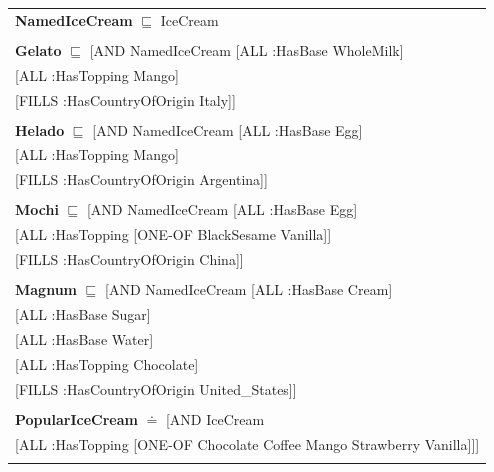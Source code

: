 \documentclass[12pt]{article}
\newcommand*{\MyIndent}{\hspace*{7em}}
\begin{document}
\begin{tabularx}{1\textwidth}{@{}X@{}}
            \textbf{NamedIceCream} $\sqsubseteq$ IceCream \\ \tabularnewline
            
            \textbf{Gelato} $\sqsubseteq$ [AND NamedIceCream [ALL :HasBase WholeMilk] \\
                                                   \MyIndent [ALL :HasTopping Mango] \\
                                                   \MyIndent [FILLS :HasCountryOfOrigin Italy]] \\
                                                   \tabularnewline
            
            \textbf{Helado} $\sqsubseteq$ [AND NamedIceCream [ALL :HasBase Egg] \\
                                                   \MyIndent [ALL :HasTopping Mango] \\
                                                   \MyIndent [FILLS :HasCountryOfOrigin Argentina]] \\
                                                   \tabularnewline

            \textbf{Mochi} $\sqsubseteq$ [AND NamedIceCream [ALL :HasBase Egg] \\
                                                  \MyIndent [ALL :HasTopping [ONE-OF BlackSesame Vanilla]] \\
                                                  \MyIndent [FILLS :HasCountryOfOrigin China]] \\
                                                  \tabularnewline

            \textbf{Magnum} $\sqsubseteq$ [AND NamedIceCream [ALL :HasBase Cream] \\
                                                   \MyIndent [ALL :HasBase Sugar] \\
                                                   \MyIndent [ALL :HasBase Water] \\
                                                   \MyIndent [ALL :HasTopping Chocolate] \\
                                                   \MyIndent [FILLS :HasCountryOfOrigin United\_States]] \\
                                                   \tabularnewline

            \textbf{PopularIceCream} $\doteq$ [AND IceCream \\
                                                  \MyIndent [ALL :HasTopping [ONE-OF Chocolate Coffee Mango Strawberry Vanilla]]] \\
                                                  \tabularnewline
            

\end{tabularx}
\end{document}
